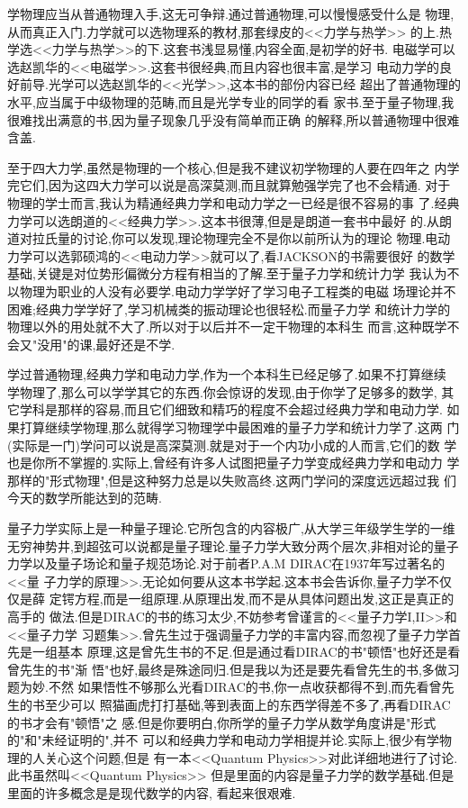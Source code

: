 学物理应当从普通物理入手,这无可争辩.通过普通物理,可以慢慢感受什么是
物理,从而真正入门.力学就可以选物理系的教材,那套绿皮的<<力学与热学>>
的上.热学选<<力学与热学>>的下.这套书浅显易懂,内容全面,是初学的好书.
电磁学可以选赵凯华的<<电磁学>>.这套书很经典,而且内容也很丰富,是学习
电动力学的良好前导.光学可以选赵凯华的<<光学>>,这本书的部份内容已经
超出了普通物理的水平,应当属于中级物理的范畴,而且是光学专业的同学的看
家书.至于量子物理,我很难找出满意的书,因为量子现象几乎没有简单而正确
的解释,所以普通物理中很难含盖.

至于四大力学,虽然是物理的一个核心,但是我不建议初学物理的人要在四年之
内学完它们,因为这四大力学可以说是高深莫测,而且就算勉强学完了也不会精通.
对于物理的学士而言,我认为精通经典力学和电动力学之一已经是很不容易的事
了.经典力学可以选朗道的<<经典力学>>.这本书很薄,但是是朗道一套书中最好
的.从朗道对拉氏量的讨论,你可以发现,理论物理完全不是你以前所认为的理论
物理.电动力学可以选郭硕鸿的<<电动力学>>就可以了,看JACKSON的书需要很好
的数学基础,关键是对位势形偏微分方程有相当的了解.至于量子力学和统计力学
我认为不以物理为职业的人没有必要学.电动力学学好了学习电子工程类的电磁
场理论并不困难;经典力学学好了,学习机械类的振动理论也很轻松.而量子力学
和统计力学的物理以外的用处就不大了.所以对于以后并不一定干物理的本科生
而言,这种既学不会又"没用"的课,最好还是不学.

学过普通物理,经典力学和电动力学,作为一个本科生已经足够了.如果不打算继续
学物理了,那么可以学学其它的东西.你会惊讶的发现,由于你学了足够多的数学,
其它学科是那样的容易,而且它们细致和精巧的程度不会超过经典力学和电动力学.
如果打算继续学物理,那么就得学习物理学中最困难的量子力学和统计力学了.这两
门(实际是一门)学问可以说是高深莫测.就是对于一个内功小成的人而言,它们的数
学也是你所不掌握的.实际上,曾经有许多人试图把量子力学变成经典力学和电动力
学那样的"形式物理",但是这种努力总是以失败高终.这两门学问的深度远远超过我
们今天的数学所能达到的范畴.

量子力学实际上是一种量子理论.它所包含的内容极广,从大学三年级学生学的一维
无穷神势井,到超弦可以说都是量子理论.量子力学大致分两个层次,非相对论的量子
力学以及量子场论和量子规范场论.对于前者P.A.M DIRAC在1937年写过著名的<<量
子力学的原理>>.无论如何要从这本书学起.这本书会告诉你,量子力学不仅仅是薛
定锷方程,而是一组原理.从原理出发,而不是从具体问题出发,这正是真正的高手的
做法.但是DIRAC的书的练习太少,不妨参考曾谨言的<<量子力学I,II>>和<<量子力学
习题集>>.曾先生过于强调量子力学的丰富内容,而忽视了量子力学首先是一组基本
原理,这是曾先生书的不足.但是通过看DIRAC的书"顿悟"也好还是看曾先生的书"渐
悟"也好,最终是殊途同归.但是我以为还是要先看曾先生的书,多做习题为妙.不然
如果悟性不够那么光看DIRAC的书,你一点收获都得不到,而先看曾先生的书至少可以
照猫画虎打打基础,等到表面上的东西学得差不多了,再看DIRAC的书才会有"顿悟"之
感.但是你要明白,你所学的量子力学从数学角度讲是"形式的"和"未经证明的",并不
可以和经典力学和电动力学相提并论.实际上,很少有学物理的人关心这个问题,但是
有一本<<Quantum Physics>>对此详细地进行了讨论.此书虽然叫<<Quantum Physics>>
但是里面的内容是量子力学的数学基础.但是里面的许多概念是是现代数学的内容,
看起来很艰难.

